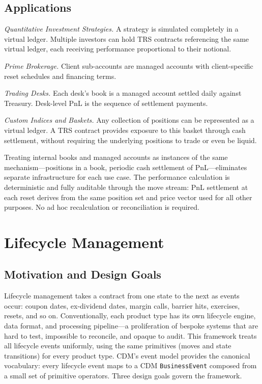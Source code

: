 \documentclass[11pt,a4paper]{article}
\begin{document}
\subsection{Applications}

\textit{Quantitative Investment Strategies.} A strategy is simulated completely in a virtual ledger. Multiple investors can hold TRS contracts referencing the same virtual ledger, each receiving performance proportional to their notional.

\textit{Prime Brokerage.} Client sub-accounts are managed accounts with client-specific reset schedules and financing terms.

\textit{Trading Desks.} Each desk's book is a managed account settled daily against Treasury. Desk-level PnL is the sequence of settlement payments.

\textit{Custom Indices and Baskets.} Any collection of positions can be represented as a virtual ledger. A TRS contract provides exposure to this basket through cash settlement, without requiring the underlying positions to trade or even be liquid.

Treating internal books and managed accounts as instances of the same mechanism---positions in a book, periodic cash settlement of PnL---eliminates separate infrastructure for each use case. The performance calculation is deterministic and fully auditable through the move stream: PnL settlement at each reset derives from the same position set and price vector used for all other purposes. No ad hoc recalculation or reconciliation is required.

\clearpage
\section{Lifecycle Management}
\label{sec:lifecycle}

\subsection{Motivation and Design Goals}

Lifecycle management takes a contract from one state to the next as events occur: coupon dates, ex-dividend dates, margin calls, barrier hits, exercises, resets, and so on. Conventionally, each product type has its own lifecycle engine, data format, and processing pipeline---a proliferation of bespoke systems that are hard to test, impossible to reconcile, and opaque to audit. This framework treats all lifecycle events uniformly, using the same primitives (moves and state transitions) for every product type. CDM's event model provides the canonical vocabulary: every lifecycle event maps to a CDM \texttt{BusinessEvent} composed from a small set of primitive operators. Three design goals govern the framework.
\end{document}

